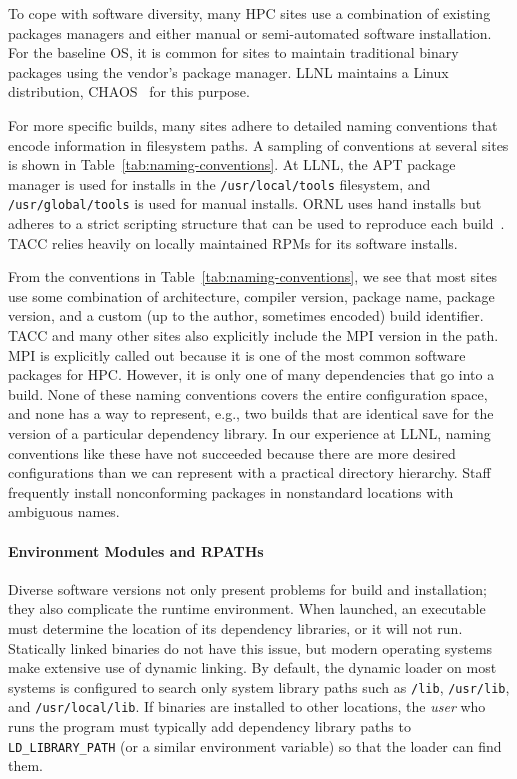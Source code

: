 To cope with software diversity, many HPC sites use a combination of existing
packages managers and either manual or semi-automated software installation.  
For the baseline OS, it is common for sites to maintain traditional binary
packages using the vendor's package manager.  LLNL maintains a Linux 
distribution, CHAOS~\cite{chaos} for this purpose.

For more specific builds, many sites adhere to detailed naming conventions
that encode information in filesystem paths. A sampling of conventions
at several sites is shown in Table~\ref{tab:naming-conventions}. At LLNL, the
APT package manager is used for installs in the {\tt /usr/local/tools} 
filesystem, and {\tt /usr/global/tools} is used for manual installs.
ORNL uses hand installs but adheres to a strict scripting structure
that can be used to reproduce each build~\cite{jones+:cug08}.
TACC relies heavily on locally maintained RPMs for its software installs.

From the conventions in Table~\ref{tab:naming-conventions},
we see that most sites use some combination of architecture, compiler version,
package name, package version, and a custom (up to the author, sometimes
encoded) build identifier.  TACC and many other sites also explicitly
include the MPI version in the path. MPI is explicitly called out
because it is one of the most common software packages for HPC.
However, it is only one of many dependencies that go into a build.
None of these naming conventions covers the entire configuration
space, and none has a way to represent, e.g., two builds that are identical
save for the version of a particular dependency library.  In our experience
at LLNL, naming conventions like these have not succeeded because there
are more desired configurations than we can represent with a practical
directory hierarchy. Staff frequently install nonconforming packages 
in nonstandard locations with ambiguous names.

\paragraph{Environment Modules and RPATHs}

Diverse software versions not only present problems for build and installation; 
they also complicate the runtime environment. When launched, an executable
must determine the location of its dependency libraries, or it will not run.
Statically linked binaries do not have this issue, but modern
operating systems make extensive use of dynamic linking.
By default, the dynamic loader on most systems is configured to search only
system library paths such as {\tt /lib}, {\tt /usr/lib}, and
{\tt /usr/local/lib}.  If binaries are installed to other locations, the
{\it user} who runs the program must typically add dependency library paths to
{\tt LD\_LIBRARY\_PATH} (or a similar environment variable) so that the loader
can find them.

